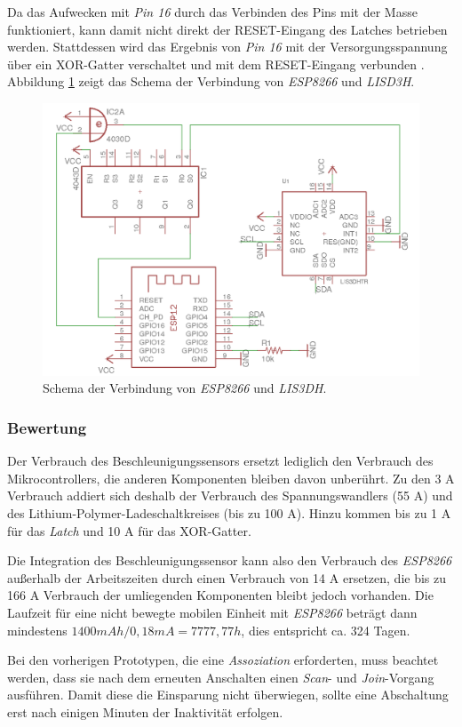 Da das Aufwecken mit \emph{Pin 16} durch das Verbinden des Pins mit der Masse funktioniert, kann damit nicht direkt der RESET-Eingang des Latches betrieben werden.
Stattdessen wird das Ergebnis von \emph{Pin 16} mit der Versorgungsspannung über ein XOR-Gatter verschaltet und mit dem RESET-Eingang verbunden \cite{texas2014xor}.
Abbildung \ref{fig:schematics} zeigt das Schema der Verbindung von \emph{ESP8266} und \emph{LISD3H}.

\begin{figure}[h]
  \centering
	\includegraphics[width=\textwidth]{images/schematics.png}
  \caption{Schema der Verbindung von \emph{ESP8266} und \emph{LIS3DH}.}
  \label{fig:schematics}
\end{figure}

\subsubsection{Bewertung}
Der Verbrauch des Beschleunigungssensors ersetzt lediglich den Verbrauch des Mikrocontrollers, die anderen Komponenten bleiben davon unberührt.
Zu den 3 \textmu A Verbrauch addiert sich deshalb der Verbrauch des Spannungswandlers (55 \textmu A) und des Lithium-Polymer-Ladeschaltkreises (bis zu 100 \textmu A).
Hinzu kommen bis zu 1 \textmu A für das \emph{Latch} und 10 \textmu A für das XOR-Gatter.

Die Integration des Beschleunigungssensor kann also den Verbrauch des \emph{ESP8266} außerhalb der Arbeitszeiten durch einen Verbrauch von 14 \textmu A ersetzen, die bis zu 166 \textmu A Verbrauch der umliegenden Komponenten bleibt jedoch vorhanden.
Die Laufzeit für eine nicht bewegte mobilen Einheit mit \emph{ESP8266} beträgt dann mindestens $1400mAh / 0,18mA = 7777,77h$, dies entspricht ca. 324 Tagen.

Bei den vorherigen Prototypen, die eine \emph{Assoziation} erforderten, muss beachtet werden, dass sie nach dem erneuten Anschalten einen \emph{Scan}- und \emph{Join}-Vorgang ausführen.
Damit diese die Einsparung nicht überwiegen, sollte eine Abschaltung erst nach einigen Minuten der Inaktivität erfolgen.


